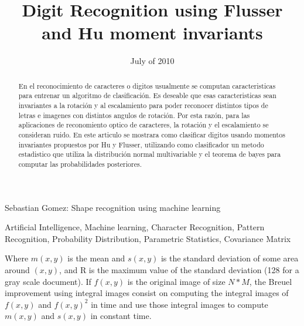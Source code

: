 \documentclass[10pt,journal]{IEEEtran}
\begin{document}
\title {Digit Recognition using Flusser and Hu moment invariants}
\date {July of 2010}

	{Sebastian Gomez: Shape recognition using machine learning}

	\maketitle

	\begin{abstract}
		En el reconocimiento de caracteres o digitos usualmente se computan caracteristicas para entrenar un algoritmo de clasificación. Es deseable que esas caracteristicas sean invariantes a la rotación y al escalamiento para poder reconocer distintos tipos de letras e imagenes con distintos angulos de rotación. Por esta razón, para las aplicaciones de reconomiento optico de caracteres, la rotación y el escalamiento se consideran ruido.
		En este articulo se mostrara como clasificar digitos usando momentos invariantes propuestos por Hu y Flusser, utilizando como clasificador un metodo estadistico que utiliza la distribución normal multivariable y el teorema de bayes para computar las probabilidades posteriores.
	\end{abstract}
	
	\begin{IEEEkeywords}
	Artificial Intelligence, Machine learning, Character Recognition, Pattern Recognition,
	Probability Distribution, Parametric Statistics, Covariance Matrix
	\end{IEEEkeywords}
	
	
 
	Where $m(x,y)$ is the mean and $s(x,y)$ is the standard deviation of some area around $(x,y)$, and R is
	the maximum value of the standard deviation (128 for a gray scale document). If $f(x,y)$ is the original
	image of size $N*M$, the Breuel improvement using integral images consist on computing 
	the integral images of $f(x,y)$ and $f(x,y)^2$ in time  and use those integral images to
	compute $m(x,y)$ and $s(x,y)$ in constant time.
	
\end{document}
